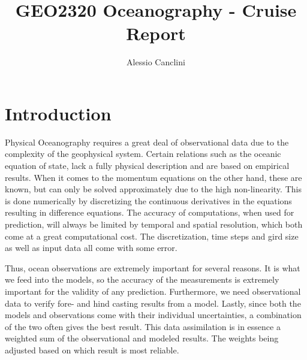 \documentclass[a4paper,10pt,english]{article}
\title{GEO2320 Oceanography - Cruise Report}
\author{Alessio Canclini}
\begin{document}
\maketitle

\section{Introduction}
Physical Oceanography requires a great deal of observational data due to the complexity of the geophysical system. Certain relations such as the oceanic equation of state, lack a fully physical description and are based on empirical results. When it comes to the momentum equations on the other hand, these are known, but can only be solved approximately due to the high non-linearity. This is done numerically by discretizing the continuous derivatives in the equations resulting in difference equations. The accuracy of computations, when used for prediction, will always be limited by temporal and spatial resolution, which both come at a great computational cost. The discretization, time steps and gird size as well as input data all come with some error.

Thus, ocean observations are extremely important for several reasons. It is what we feed into the models, so the accuracy of the measurements is extremely important for the validity of any prediction. Furthermore, we need observational data to verify fore- and hind casting results from a model. Lastly, since both the models and observations come with their individual uncertainties, a combination of the two often gives the best result. This data assimilation is in essence a weighted sum of the observational and modeled results. The weights being adjusted based on which result is most reliable.
\end{document}
